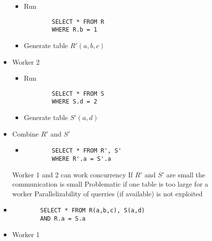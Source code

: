 \begin{itemize}
\begin{itemize}
\begin{itemize}
\begin{itemize}
                                \begin{itemize}
                                    \item Run
        \begin{verbatim}
        SELECT * FROM R
        WHERE R.b = 1
        \end{verbatim}
                                    \item Generate table $R'(a, b, c)$
                                \end{itemize}
                            \item Worker 2
                                \begin{itemize}
                                    \item Run
        \begin{verbatim}
        SELECT * FROM S
        WHERE S.d = 2
        \end{verbatim}
                                    \item Generate table $S'(a, d)$
                                \end{itemize}
                            \item Combine $R'$ and $S'$
                                \begin{itemize}
                                    \item
        \begin{verbatim}
        SELECT * FROM R', S'
        WHERE R'.a = S'.a
        \end{verbatim}
                                \end{itemize}
                            \ipro Worker 1 and 2 can work concurrency
                            \ipro If $R'$ and $S'$ are small the communication is small
                            \icon Problematic if one table is too large for a worker
                            \icon Parallelizability of querries (if available) is not exploited
                        \end{itemize}
                        \begin{itemize}
                            \item 
        \begin{verbatim}
        SELECT * FROM R(a,b,c), S(a,d)
        AND R.a = S.a
        \end{verbatim}
                            \item Worker 1

\end{itemize}
\end{itemize}
\end{itemize}
\end{itemize}
